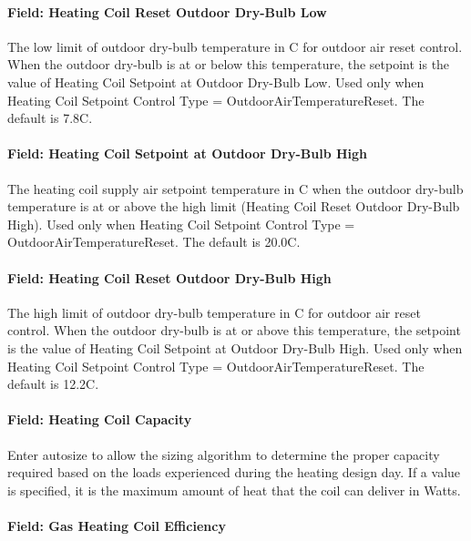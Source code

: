 \paragraph{Field: Heating Coil Reset Outdoor Dry-Bulb Low}\label{field-heating-coil-reset-outdoor-dry-bulb-low-1}

The low limit of outdoor dry-bulb temperature in C for outdoor air reset control. When the outdoor dry-bulb is at or below this temperature, the setpoint is the value of Heating Coil Setpoint at Outdoor Dry-Bulb Low. Used only when Heating Coil Setpoint Control Type = OutdoorAirTemperatureReset. The default is 7.8C.

\paragraph{Field: Heating Coil Setpoint at Outdoor Dry-Bulb High}\label{field-heating-coil-setpoint-at-outdoor-dry-bulb-high-1}

The heating coil supply air setpoint temperature in C when the outdoor dry-bulb temperature is at or above the high limit (Heating Coil Reset Outdoor Dry-Bulb High). Used only when Heating Coil Setpoint Control Type = OutdoorAirTemperatureReset. The default is 20.0C.

\paragraph{Field: Heating Coil Reset Outdoor Dry-Bulb High}\label{field-heating-coil-reset-outdoor-dry-bulb-high-1}

The high limit of outdoor dry-bulb temperature in C for outdoor air reset control. When the outdoor dry-bulb is at or above this temperature, the setpoint is the value of Heating Coil Setpoint at Outdoor Dry-Bulb High. Used only when Heating Coil Setpoint Control Type = OutdoorAirTemperatureReset. The default is 12.2C.

\paragraph{Field: Heating Coil Capacity}\label{field-heating-coil-capacity-4}

Enter autosize to allow the sizing algorithm to determine the proper capacity required based on the loads experienced during the heating design day. If a value is specified, it is the maximum amount of heat that the coil can deliver in Watts.

\paragraph{Field: Gas Heating Coil Efficiency}\label{field-gas-heating-coil-efficiency-6}

